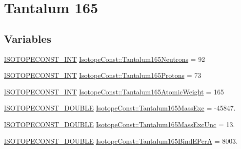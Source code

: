 \hypertarget{group___isotope_const-_tantalum-_ta165}{}\section{Tantalum 165}
\label{group___isotope_const-_tantalum-_ta165}
\subsection*{Variables}
\begin{DoxyCompactItemize}
\item 
\mbox{\hyperlink{group___isotope_const-_macros_ga5f18360b3e99483a35c32d789e62621c}{I\+S\+O\+T\+O\+P\+E\+C\+O\+N\+S\+T\+\_\+\+I\+NT}} \mbox{\hyperlink{group___isotope_const-_tantalum-_ta165_gab5df7a8acd4e51f88969f04ea8185022}{Isotope\+Const\+::\+Tantalum165\+Neutrons}} = 92
\item 
\mbox{\hyperlink{group___isotope_const-_macros_ga5f18360b3e99483a35c32d789e62621c}{I\+S\+O\+T\+O\+P\+E\+C\+O\+N\+S\+T\+\_\+\+I\+NT}} \mbox{\hyperlink{group___isotope_const-_tantalum-_ta165_ga230a1305220ed00d827f6eb38b733149}{Isotope\+Const\+::\+Tantalum165\+Protons}} = 73
\item 
\mbox{\hyperlink{group___isotope_const-_macros_ga5f18360b3e99483a35c32d789e62621c}{I\+S\+O\+T\+O\+P\+E\+C\+O\+N\+S\+T\+\_\+\+I\+NT}} \mbox{\hyperlink{group___isotope_const-_tantalum-_ta165_gad5b9489fb3c61667e2788ac0934bcb62}{Isotope\+Const\+::\+Tantalum165\+Atomic\+Weight}} = 165
\item 
\mbox{\hyperlink{group___isotope_const-_macros_ga8f45a7272ce02c0b4c65c44636ed719a}{I\+S\+O\+T\+O\+P\+E\+C\+O\+N\+S\+T\+\_\+\+D\+O\+U\+B\+LE}} \mbox{\hyperlink{group___isotope_const-_tantalum-_ta165_gaa22b3a77b39fd8afdd56b78080f35847}{Isotope\+Const\+::\+Tantalum165\+Mass\+Exc}} = -\/45847.
\item 
\mbox{\hyperlink{group___isotope_const-_macros_ga8f45a7272ce02c0b4c65c44636ed719a}{I\+S\+O\+T\+O\+P\+E\+C\+O\+N\+S\+T\+\_\+\+D\+O\+U\+B\+LE}} \mbox{\hyperlink{group___isotope_const-_tantalum-_ta165_ga3b5da3ff70cb55124d347687cd48b51b}{Isotope\+Const\+::\+Tantalum165\+Mass\+Exc\+Unc}} = 13.
\item 
\mbox{\hyperlink{group___isotope_const-_macros_ga8f45a7272ce02c0b4c65c44636ed719a}{I\+S\+O\+T\+O\+P\+E\+C\+O\+N\+S\+T\+\_\+\+D\+O\+U\+B\+LE}} \mbox{\hyperlink{group___isotope_const-_tantalum-_ta165_gae5981e959af7c6a0f65ab8021e883678}{Isotope\+Const\+::\+Tantalum165\+Bind\+E\+PerA}} = 8003.
\item 

\end{DoxyCompactItemize}
